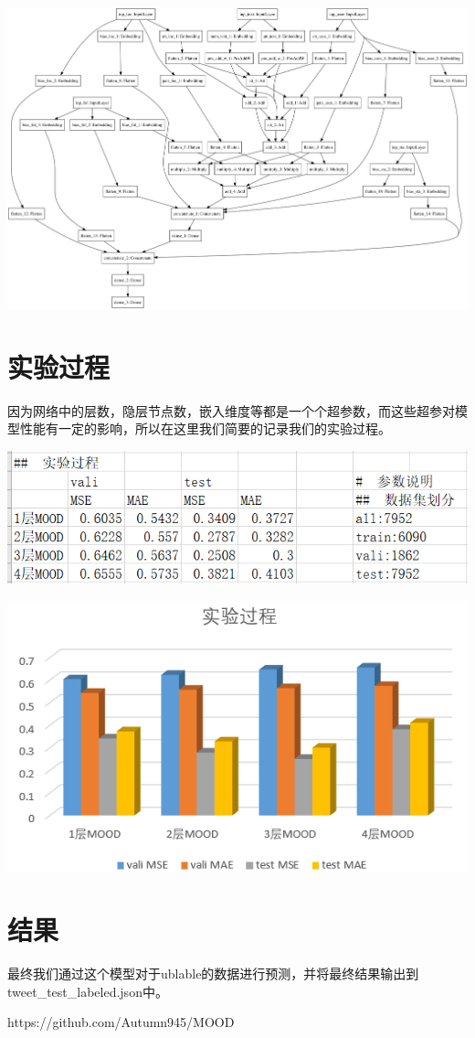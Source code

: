 \documentclass[a4paper, 12pt]{ctexart}
\begin{document}
\includegraphics[width=6inc]{tweet_pics/model_noshape}

\section{实验过程}
因为网络中的层数，隐层节点数，嵌入维度等都是一个个超参数，而这些超参对模型性能有一定的影响，所以在这里我们简要的记录我们的实验过程。

\includegraphics[width=6inc]{tweet_pics/tb}

\includegraphics[width=6inc]{tweet_pics/graph}

\section{结果}
最终我们通过这个模型对于ublable的数据进行预测，并将最终结果输出到tweet\_test\_labeled.json中。
\renewcommand{\refname}{Reference}
\begin{thebibliography}{9}
     https://github.com/Autumn945/MOOD
    \end{thebibliography}
\end{document}
